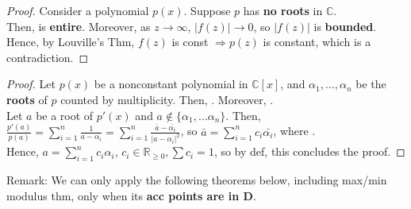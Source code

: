 \documentclass[12pt,a4paper]{article}
\begin{document}
\begin{proof}
  Consider a polynomial $p(x)$. Suppose $p$ has \textbf{no roots} in $\mathbb{C}$. \\

  \noindent Then,  is \textbf{entire}. Moreover, as $z \to \infty$, $|f(z)| \to 0$, so $|f(z)|$ is \textbf{bounded}. \\

  \noindent Hence, by Louville's Thm, $f(z)$ is const $\Rightarrow p(z)$ is constant, which is a contradiction.
\end{proof}


\begin{proof}
  Let $p(x)$ be a nonconstant polynomial in $\mathbb{C}[x]$, and $\alpha_1, \dots, \alpha_n$ be the \textbf{roots} of $p$ counted by multiplicity. Then, . Moreover, . \\

  \noindent Let $a$ be a root of $p'(x)$ and $a \notin \{\alpha_1, \dots \alpha_n\}$. Then, $\frac{p'(a)}{p(a)} = \sum_{i = 1}^n \frac{1}{a - \alpha_i} = \sum_{i = 1}^n \frac{\bar{a} - \bar{\alpha_i}}{|a - \alpha_i|^2}$, so $\bar{a} = \sum_{i = 1}^n c_i \bar{\alpha_i}$, where . \\

  \noindent Hence, $a = \sum_{i = 1}^n c_i \alpha_i$, $c_i \in \mathbb{R}_{\geq 0}, \sum c_i = 1$, so by def, this concludes the proof.
\end{proof}

\vspace{1.0em}


\noindent Remark: We can only apply the following theorems below, including max/min modulus thm, only when its \textbf{acc points are in D}. \\

\end{document}
